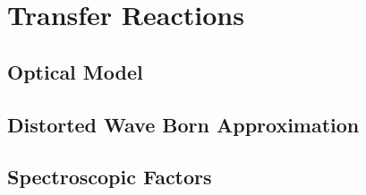 \section{Transfer Reactions}



\subsection{Optical Model} \label{subsec:Optical_Model}

\subsection{Distorted Wave Born Approximation}

\subsection{Spectroscopic Factors}

\subsection{}